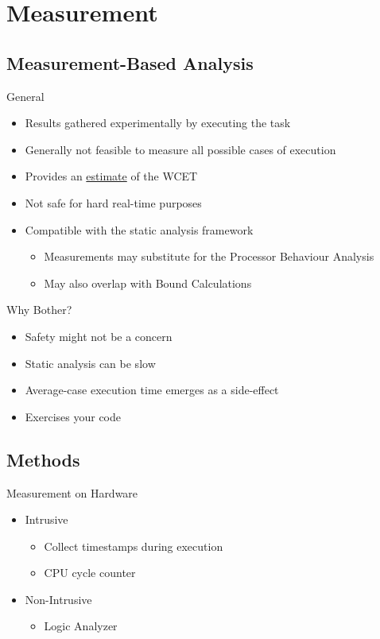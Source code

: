 \documentclass{beamer}
\begin{document}
\section{Measurement}
\subsection{Measurement-Based Analysis}
\begin{frame}{General}
  \begin{itemize}
    \item Results gathered experimentally by executing the task
    \item Generally not feasible to measure all possible cases of execution
    \item Provides an \underline{estimate} of the WCET
    \item Not safe for hard real-time purposes
      \pause
    \item Compatible with the static analysis framework
      \begin{itemize}
        \item Measurements may substitute for the Processor Behaviour Analysis
        \item May also overlap with Bound Calculations
      \end{itemize}
  \end{itemize}
\end{frame}

\begin{frame}{Why Bother?}
  \begin{itemize}
    \item Safety might not be a concern
    \item Static analysis can be slow
    \item Average-case execution time emerges as a side-effect
    \item \alert{Exercises your code}
  \end{itemize}
\end{frame}

\subsection{Methods}
\begin{frame}{Measurement on Hardware}
  \begin{itemize}
    \item Intrusive
      \begin{itemize}
        \item Collect timestamps during execution
        \item CPU cycle counter
      \end{itemize}
    \item Non-Intrusive
      \begin{itemize}
        \item Logic Analyzer
      \end{itemize}
  \end{itemize}
\end{frame}
  
\end{document}
